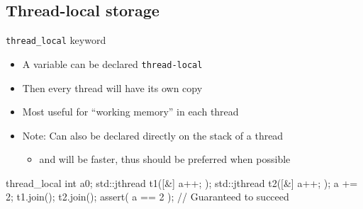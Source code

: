 \subsection[TLS]{Thread-local storage}

\begin{frame}[fragile]
  \begin{block}{\texttt{thread_local} keyword}
    \begin{itemize}
      \item A variable can be declared \texttt{thread-local}
      \item Then every thread will have its own copy
      \item Most useful for ``working memory'' in each thread
      \item Note: Can also be declared directly on the stack of a thread
      \begin{itemize}
        \item and will be faster, thus should be preferred when possible
      \end{itemize}
    \end{itemize}
  \end{block}
  \begin{exampleblock}{}
    \begin{cppcode*}{}
      thread_local int a{0};
      std::jthread t1([&] { a++; });
      std::jthread t2([&] { a++; });
      a += 2;
      t1.join(); t2.join();
      assert( a == 2 ); // Guaranteed to succeed
    \end{cppcode*}
  \end{exampleblock}
\end{frame}
